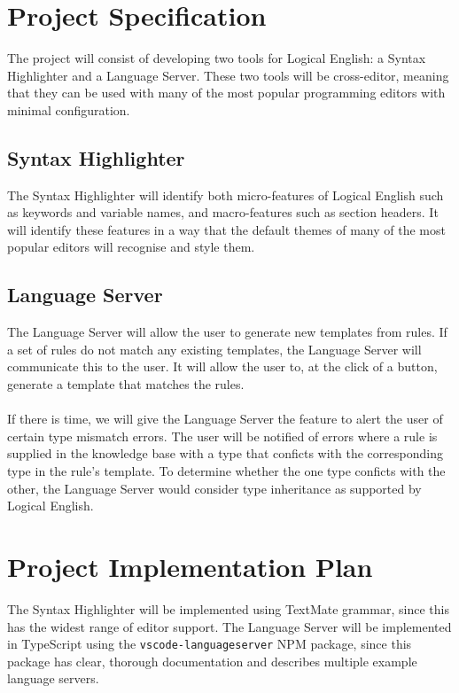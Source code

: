 \documentclass[../main.tex]{subfiles}
\begin{document}
\section*{Project Specification}
The project will consist of developing two tools for Logical English: a Syntax Highlighter and a Language Server. These two tools will be cross-editor, meaning that they can be used with many of the most popular programming editors with minimal configuration.

\subsection*{Syntax Highlighter}
The Syntax Highlighter will identify both micro-features of Logical English such as keywords and variable names, and macro-features such as section headers. It will identify these features in a way that the default themes of many of the most popular editors will recognise and style them. 

\subsection*{Language Server}
The Language Server will allow the user to generate new templates from rules. If a set of rules do not match any existing templates, the Language Server will communicate this to the user. It will allow the user to, at the click of a button, generate a template that matches the rules. 
\\ \\ 
If there is time, we will give the Language Server the feature to alert the user of certain type mismatch errors. The user will be notified of errors where a rule is supplied in the knowledge base with a type that conficts with the corresponding type in the rule's template. To determine whether the one type conficts with the other, the Language Server would consider type inheritance as supported by Logical English.

\section*{Project Implementation Plan}
The Syntax Highlighter will be implemented using TextMate grammar, since this has the widest range of editor support. The Language Server will be implemented in TypeScript using the \texttt{vscode-languageserver} NPM package, since this package has clear, thorough documentation and describes multiple example language servers.
\end{document}
